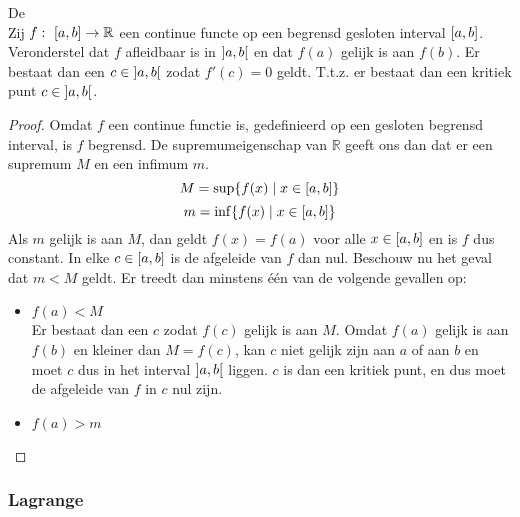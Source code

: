 \documentclass[main.tex]{subfiles}
\begin{document}
\begin{st}
  \label{st:rolle}
  De \\
  Zij $f:\ \interval{a}{b} \rightarrow \mathbb{R}$ een continue functe op een begrensd gesloten interval $\interval{a}{b}$.
  Veronderstel dat $f$ afleidbaar is in $\interval[open]{a}{b}$ en dat $f(a)$ gelijk is aan $f(b)$.
  Er bestaat dan een $c\in \interval[open]{a}{b}$ zodat $f'(c)=0$ geldt.
  T.t.z. er bestaat dan een kritiek punt $c\in \interval[open]{a}{b}$.

  \begin{proof}
    Omdat $f$ een continue functie is, gedefinieerd op een gesloten begrensd interval, is $f$ begrensd.\needed
    De supremumeigenschap van $\mathbb{R}$ geeft ons dan dat er een supremum $M$ en een infimum $m$.
    \[ M = \sup\{f(x) \mid x \in \interval{a}{b} \} \]
    \[ m = \inf\{f(x) \mid x \in \interval{a}{b} \} \]
    Als $m$ gelijk is aan $M$, dan geldt $f(x)=f(a)$ voor alle $x \in \interval{a}{b}$ en is $f$ dus constant.
    In elke $c \in \interval{a}{b}$ is de afgeleide van $f$ dan nul.
    Beschouw nu het geval dat $m< M$ geldt.
    Er treedt dan minstens \'e\'en van de volgende gevallen op:
    \begin{itemize}
    \item $f(a) < M$\\
      Er bestaat dan een $c$ zodat $f(c)$ gelijk is aan $M$.\needed
      Omdat $f(a)$ gelijk is aan $f(b)$ en kleiner dan $M=f(c)$, kan $c$ niet gelijk zijn aan $a$ of aan $b$ en moet $c$ dus in het interval $\interval[open]{a}{b}$ liggen.
      $c$ is dan een kritiek punt, en dus moet de afgeleide van $f$ in $c$ nul zijn.\needed
    \item $f(a) > m$\\
    \end{itemize}
  \end{proof}
\end{st}

\subsubsection{Lagrange}
\label{sec:middelwaardestelling-lagrange}
\end{document}
